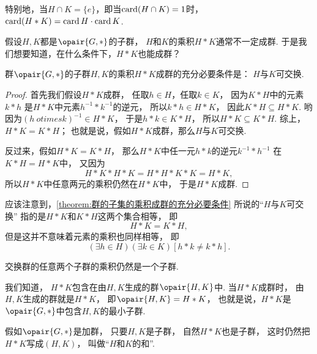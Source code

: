 特别地，当\(H \cap K = \{e\}\)，即当\(\operatorname{card}(H \cap K) = 1\)时，
\(\operatorname{card}(H * K) = \operatorname{card} H \cdot \operatorname{card} K\).

假设\(H,K\)都是\(\opair{G,*}\)的子群，
\(H\)和\(K\)的乘积\(H * K\)通常不一定成群.
于是我们想要知道，在什么条件下，\(H * K\)也能成群？

\begin{theorem}\label{theorem:群的子集的乘积成群的充分必要条件}
群\(\opair{G,*}\)的子群\(H,K\)的乘积\(H * K\)成群的充分必要条件是：
\(H\)与\(K\)可交换.
\begin{proof}
首先我们假设\(H * K\)成群，
任取\(h \in H\)，任取\(k \in K\)，
因为\(K * H\)中的元素\(k * h\)
是\(H * K\)中元素\(h^{-1} * k^{-1}\)的逆元，
所以\(k * h \in H * K\)，
因此\(K * H \subseteq H * K\).
哟因为\((h\ otimes k)^{-1} \in H * K\)，
于是\(h * k \in K * H\)，
所以\(H * K \subseteq K * H\).
综上，\(H * K = K * H\)；
也就是说，假如\(H * K\)成群，那么\(H\)与\(K\)可交换.

反过来，假如\(H * K = K * H\)，
那么\(H * K\)中任一元\(h * k\)的逆元\(k^{-1} * h^{-1}\)
在\(K * H = H * K\)中，
又因为\begin{equation*}
	H * K * H * K
	= H * H * K * K
	= H * K,
\end{equation*}
所以\(H * K\)中任意两元的乘积仍然在\(H * K\)中，
于是\(H * K\)成群.
\end{proof}
\end{theorem}

应该注意到，\cref{theorem:群的子集的乘积成群的充分必要条件} 所说的“\(H\)与\(K\)可交换”
指的是\(H * K\)和\(K * H\)这两个集合相等，
即\begin{equation*}
	H * K = K * H,
\end{equation*}
但是这并不意味着元素的乘积也同样相等，
即\begin{equation*}
	(\exists h \in H)(\exists k \in K)[h * k \neq k * h].
\end{equation*}

\begin{corollary}
交换群的任意两个子群的乘积仍然是一个子群.
\end{corollary}

我们知道，
\(H * K\)包含在由\(H,K\)生成的群\(\opair{H,K}\)中.
当\(H * K\)成群时，
由\(H,K\)生成的群就是\(H * K\)，
即\(\opair{H,K} = H * K\)，
也就是说，\(H * K\)是\(\opair{G,*}\)中包含\(H,K\)的最小子群.

假如\(\opair{G,*}\)是加群，
只要\(H,K\)是子群，
自然\(H * K\)也是子群，
这时仍然把\(H * K\)写成\((H,K)\)，
叫做“\(H\)和\(K\)的和”.


